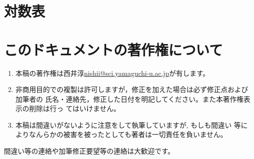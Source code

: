 \documentclass[twocolumn,11pt]{jarticle}
\begin{document}

  
\rule{0pt}{10cm}
\newpage

\appendix
\section{対数表\label{app:ln}}


\newpage

\vspace*{1cm}
\newpage

\section{このドキュメントの著作権について}

\begin{enumerate}
\item 本稿の著作権は西井淳\url{nishii@sci.yamaguchi-u.ac.jp}が有します。
\item 非商用目的での複製は許可しますが，修正を加えた場合は必ず修正点および加筆者の
氏名・連絡先，修正した日付を明記してください。また本著作権表示の削除は行っ
てはいけません。
\item 本稿は間違いがないように注意をして執筆していますが, もしも間違い
  等によりなんらかの被害を被ったとしても著者は一切責任を負いません。
\end{enumerate}
間違い等の連絡や加筆修正要望等の連絡は大歓迎です。



\printindex
\end{document}
